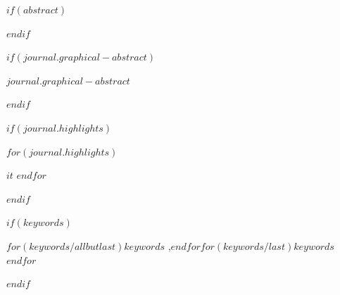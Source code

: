$if(abstract)$
\begin{abstract}
$abstract$
\end{abstract}
$endif$

$if(journal.graphical-abstract)$
\begin{graphicalabstract}
$journal.graphical-abstract$
\end{graphicalabstract}
$endif$

$if(journal.highlights)$
\begin{highlights}
$for(journal.highlights)$\item $it$
$endfor$
\end{highlights}
$endif$

$if(keywords)$
\begin{keywords}
$for(keywords/allbutlast)$$keywords$ \sep $endfor$$for(keywords/last)$$keywords$$endfor$
\end{keywords}
$endif$
\maketitle
